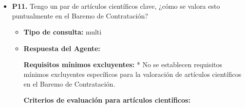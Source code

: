 \documentclass{article}
\begin{document}
\begin{itemize}
\begin{itemize}
                        Recuerda que, en caso de desestimación, puedes interponer \textbf{recurso de alzada} ante el \textbf{Rector} de la Universidad de Sevilla.
                  \item \textbf{Contexto utilizado:}

            \end{itemize}

      \item \textbf{P11.} Tengo un par de artículos científicos clave, ¿cómo se valora esto puntualmente en el Baremo de Contratación? \\
            \begin{itemize}
                  \item \textbf{Tipo de consulta:} multi
                  \item \textbf{Respuesta del Agente:}

                        \textbf{Requisitos mínimos excluyentes:}
                        * No se establecen requisitos mínimos excluyentes específicos para la valoración de artículos científicos en el Baremo de Contratación.

                        \textbf{Criterios de evaluación para artículos científicos:}


\end{itemize}
\end{itemize}
\end{document}
